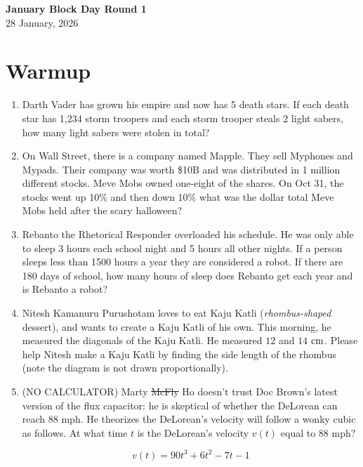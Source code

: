 \documentclass[a4paper]{article}
\begin{document}
\begin{center}
{\Large\bfseries January Block Day Round 1}\\[0.25cm]
{\large 28 January, 2026}\\[1cm]
\end{center}

\section*{Warmup}
\begin{enumerate}[itemsep=2cm]
    \item Darth Vader has grown his empire and now has 5 death stars. If each death star has 1,234 storm troopers and each storm trooper steals 2 light sabers, how many light sabers were stolen in total?
    \item On Wall Street, there is a company named Mapple. They sell Myphones and Mypads. Their company was worth \$10B and was distributed in 1 million different stocks. Meve Mobs owned one-eight of the shares. On Oct 31, the stocks went up 10\% and then down 10\% what was the dollar total Meve Mobs held after the scary halloween?
    \item Rebanto the Rhetorical Responder overloaded his schedule. He was only able to sleep 3 hours each school night and 5 hours all other nights. If a person sleeps less than 1500 hours a year they are considered a robot. If there are 180 days of school, how many hours of sleep does Rebanto get each year and is Rebanto a robot?    
    \item Nitesh Kamanuru Purushotam loves to eat Kaju Katli (\textit{rhombus-shaped} dessert), and wants to create a Kaju Katli of his own. This morning, he measured the diagonals of the Kaju Katli. He measured $12$ and $14$ $\rm cm$. Please help Nitesh make a Kaju Katli by finding the side length of the rhombus (note the diagram is not drawn proportionally).
    
    \vspace{0.5cm}
    \begin{center}
    \end{center}
    \item (NO CALCULATOR) Marty \sout{McFly} Ho doesn't trust Doc Brown's latest version of the flux capacitor: he is skeptical of whether the DeLorean can reach 88 mph. He theorizes the DeLorean's velocity will follow a wonky cubic as follows. At what time $t$ is the DeLorean's velocity $v(t)$ equal to 88 mph?

    $$v(t) = 90t^3+6t^2-7t-1$$
    

    \end{enumerate}
\end{document}
